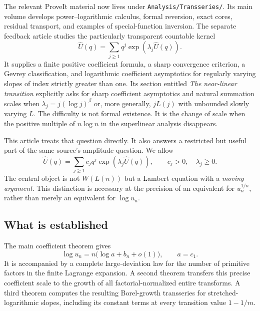 \documentclass[11pt,a4paper]{article}
\numberwithin{equation}{section}
\theoremstyle{definition}
\theoremstyle{remark}
\newcommand{\Uhat}{\widehat U}
\begin{document}
The relevant ProveIt material now lives under
\texttt{Analysis/Transseries/}. Its main volume develops power--logarithmic
calculus, formal reversion, exact cores, residual transport, and examples
of special-function inversion. The separate feedback article
\cite{repo-feedback} studies the particularly transparent countable kernel
\begin{equation}
 \Uhat(q)=\sum_{j\ge1}q^j\exp(\lambda_j\Uhat(q)).
 \label{eq:unit-model}
\end{equation}
It supplies a finite positive coefficient formula, a sharp convergence
criterion, a Gevrey classification, and logarithmic coefficient
asymptotics for regularly varying slopes of index strictly greater than
one. Its section entitled \emph{The near-linear transition} explicitly
asks for sharp coefficient asymptotics and natural summation scales when
$\lambda_j=j(\log j)^\beta$ or, more generally, $jL(j)$ with unbounded
slowly varying $L$. The difficulty is not formal existence. It is the
change of scale when the positive multiple of $n\log n$ in the
superlinear analysis disappears.

This article treats that question directly. It also answers a restricted
but useful part of the same source's amplitude question. We allow
\begin{equation}
 \Uhat(q)=\sum_{j\ge1}c_jq^j\exp(\lambda_j\Uhat(q)),
 \qquad c_j>0,\quad\lambda_j\ge0.
 \label{eq:model}
\end{equation}
The central object is not $W(L(n))$ but a Lambert equation with a
\emph{moving argument}. This distinction is necessary at the precision
of an equivalent for $u_n^{1/n}$, rather than merely an equivalent for
$\log u_n$.

\subsection{What is established}
The main coefficient theorem gives
\begin{equation}
 \log u_n=n\bigl(\log a+b_n+o(1)\bigr),\qquad a=c_1.
 \label{eq:headline}
\end{equation}
It is accompanied by a complete large-deviation law for the number of
primitive factors in the finite Lagrange expansion. A second theorem
transfers this precise coefficient scale to the growth of all
factorial-normalized entire transforms. A third theorem computes the
resulting Borel-growth transseries for stretched-logarithmic slopes,
including its constant terms at every transition value $1-1/m$.
\end{document}

